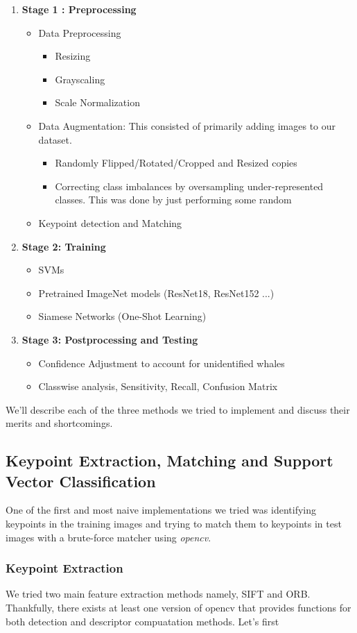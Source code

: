 \begin{enumerate}
	\item \textbf{Stage 1 : Preprocessing}
	\begin{itemize}
		\item Data Preprocessing
		\begin{itemize}
			\item Resizing
			\item Grayscaling
			\item Scale Normalization
		\end{itemize}
		\item Data Augmentation: This consisted of primarily adding images to our dataset.
		\begin{itemize}
			\item Randomly Flipped/Rotated/Cropped and Resized copies
			\item Correcting class imbalances by oversampling under-represented classes. This was done by just performing some random
		\end{itemize}
		\item Keypoint detection and Matching
	\end{itemize}
	\item \textbf{Stage 2: Training}
	\begin{itemize}
		\item SVMs
		\item Pretrained ImageNet models (ResNet18, ResNet152 ...)
		\item Siamese Networks (One-Shot Learning)
	\end{itemize}
	\item \textbf{Stage 3: Postprocessing and Testing}
	\begin{itemize}
		\item Confidence Adjustment to account for unidentified whales
		\item Classwise analysis, Sensitivity, Recall, Confusion Matrix
	\end{itemize}
\end{enumerate}

We'll describe each of the three methods we tried to implement and discuss their merits and shortcomings.

\subsection{Keypoint Extraction, Matching and Support Vector Classification}

One of the first and most naive implementations we tried was identifying keypoints in the training images and trying to match them to keypoints in test images with a brute-force matcher using \textit{opencv}. 

\subsubsection{Keypoint Extraction}

We tried two main feature extraction methods namely, SIFT and ORB. Thankfully, there exists at least one version of opencv that provides functions for both detection and descriptor compuatation methods. Let's first 
